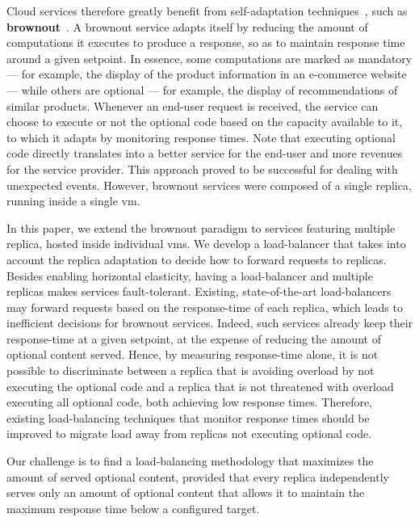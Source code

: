 Cloud services therefore greatly benefit from
self-adaptation techniques~\cite{SalehieSelfadaptive:TAAS}, such as
{\bf brownout}~\citep{cloudish-tr}. A brownout service
adapts itself by reducing the amount of computations it executes
to produce a response, so as to maintain response time around a given setpoint.
In essence, some computations are
marked as mandatory --- for example, the display of the product
information in an e-commerce website --- while others are optional ---
for example, the display of recommendations of similar products.
Whenever an end-user request is received, the service can choose to execute
or not the optional code based on the capacity available to it,
to which it adapts by monitoring response times. Note that executing optional code directly
translates into a better service for the end-user and more revenues for
the service provider. This approach proved to be successful for dealing with
unexpected events. However, brownout services were composed
of a single replica, running inside a single \ac{vm}.

In this paper, we extend the brownout paradigm to services featuring
multiple replica, hosted inside individual \acp{vm}. We develop
a load-balancer that takes into account the replica
adaptation to decide how to forward requests to replicas.
Besides enabling horizontal elasticity, having a load-balancer and multiple replicas
makes services fault-tolerant. Existing, state-of-the-art
load-balancers may forward requests based on the response-time of each
replica, which leads to inefficient decisions for brownout services.
Indeed, such services already keep their response-time
at a given setpoint, at the expense of reducing the amount of optional
content served. Hence, by measuring response-time alone, it is not possible
to discriminate between a replica that is avoiding overload by not
executing the optional code and a replica that is not threatened with
overload executing all optional code, both achieving low response
times.  Therefore, existing load-balancing techniques that monitor
response times should be improved to migrate load away from replicas
not executing optional code.

Our challenge is to find a load-balancing methodology that maximizes
the amount of served optional content, provided that every replica
independently serves only an amount of optional content that allows it
to maintain the maximum response time below a configured target.

